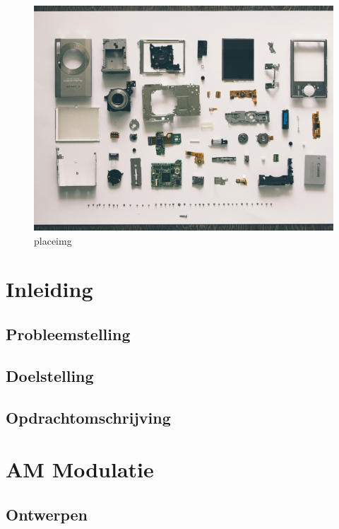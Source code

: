 \documentclass[11pt,a4paper]{article}
\begin{document}
	\begin{figure}[H]
		\includegraphics[width=1.0\textwidth]{placeimg}\par\vspace{1cm}
		\caption{placeimg}
		\label{fig:length_eight_mouse}
	\end{figure}
	\clearpage
	
	\section{Inleiding}
		\subsection{Probleemstelling}
		\subsection{Doelstelling}
		\subsection{Opdrachtomschrijving}
	\clearpage

	\section{AM Modulatie}
		\subsection{Ontwerpen}
\end{document}
